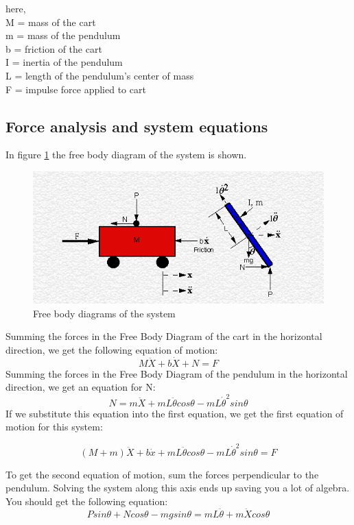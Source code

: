\documentclass[12pt]{article}
\begin{document}
here,\\
M = mass of the cart\\
m = mass of the pendulum\\
b = friction of the cart\\
I = inertia of the pendulum\\
L = length of the pendulum's center of mass\\
F = impulse force applied to cart
\subsection{Force analysis and system equations}
In figure \ref{fig:freebody} the free body diagram of the system is shown.
\begin{figure}[h]
	\centering
	\includegraphics{freebody.png}
	\caption{Free body diagrams of the system}
	\label{fig:freebody}
\end{figure}

Summing the forces in the Free Body Diagram of the cart in the horizontal direction, we get the following equation of motion:
\begin{equation}
M\ddot{X} + b\dot{X} + N = F
\end{equation}
Summing the forces in the Free Body Diagram of the pendulum in the horizontal direction, we get an equation for N:
\begin{equation}
N = m\ddot{X} + mL\ddot{\theta}cos\theta -mL\dot{\theta}^2sin\theta
\end{equation}
If we substitute this equation into the first equation, we get the first equation of motion for this system:

\begin{equation}
(M+m)\ddot{X}+b\dot{x}+mL\ddot{\theta}cos\theta-mL\dot{\theta}^2sin\theta=F
\end{equation}



To get the second equation of motion, sum the forces perpendicular to the pendulum. Solving the system along this axis ends up saving you a lot of algebra. You should get the following equation:
\begin{equation}
Psin\theta+Ncos\theta-mgsin\theta=mL\ddot{\theta}+m\ddot{X}cos\theta
\end{equation}
\end{document}
